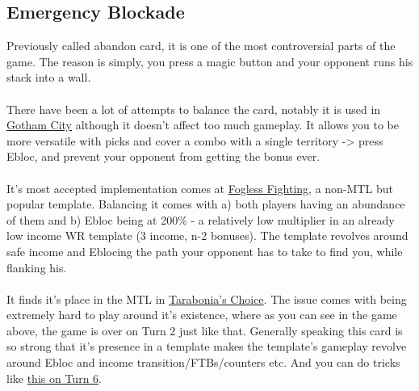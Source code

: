 \subsection{Emergency Blockade}

Previously called abandon card, it is one of the most controversial parts of the game. The reason is simply, you press a magic button and your opponent runs his stack into a wall. 
\\
\\
There have been a lot of attempts to balance the card, notably it is used in \href{https://www.warzone.com/MultiPlayer/Tournament?ID=60562}{Gotham City} although it doesn't affect too much gameplay. It allows you to be more versatile with picks and cover a combo with a single territory -> press Ebloc, and prevent your opponent from getting the bonus ever.
\\
\\
It's most accepted implementation comes at \href{https://www.warzone.com/MultiPlayer/Tournament?ID=53958}{Fogless Fighting}, a non-MTL but popular template. Balancing it comes with a) both players having an abundance of them and b) Ebloc being at 200\% - a relatively low multiplier in an already low income WR template (3 income, n-2 bonuses). The template revolves around safe income and Eblocing the path your opponent has to take to find you, while flanking his. 
\\
\\
It finds it's place in the MTL in \href{https://www.warzone.com/MultiPlayer?GameID=40249704}{Tarabonia's Choice}. The issue comes with being extremely hard to play around it's existence, where as you can see in the game above, the game is over on Turn 2 just like that. Generally speaking this card is so strong that it's presence in a template makes the template's gameplay revolve around Ebloc and income transition/FTBs/counters etc. And you can do tricks like \href{https://www.warzone.com/MultiPlayer?GameID=38030095}{this on Turn 6}.




